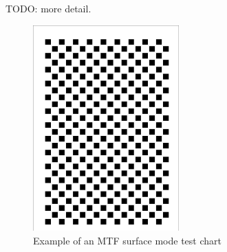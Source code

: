 \documentclass[a4paper]{article}
\begin{document}
TODO: more detail.

\begin{figure}
\centering
\includegraphics[width=0.5\textwidth,angle=90]{figures/mtf_surface_test_chart.pdf}
\caption{Example of an MTF surface mode test chart}
\label{fig:surface_test_chart}
\end{figure}
\end{document}
